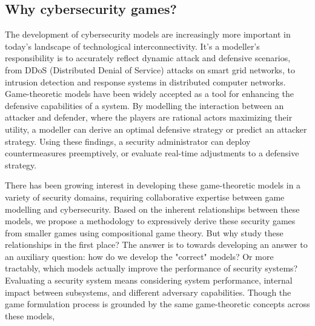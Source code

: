 





\subsection{Why cybersecurity games?}

The development of cybersecurity models are increasingly more important in today's landscape of technological interconnectivity. It's a modeller's responsibility is to accurately reflect dynamic attack and defensive scenarios, from DDoS (Distributed Denial of Service) attacks on smart grid networks, to intrusion detection and response systems in distributed computer networks. Game-theoretic models have been widely accepted as a tool for enhancing the defensive capabilities of a system. By modelling the interaction between an attacker and defender, where the players are rational actors maximizing their utility, a modeller can derive an optimal defensive strategy or predict an attacker strategy. Using these findings, a security administrator can deploy countermeasures preemptively, or evaluate real-time adjustments to a defensive strategy. 

There has been growing interest in developing these game-theoretic models in a variety of security domains, requiring collaborative expertise between game modelling and cybersecurity. Based on the inherent relationships between these models, we propose a methodology to expressively derive these security games from smaller games using compositional game theory. But why study these relationships in the first place? The answer is to towards developing an answer to an auxiliary question: how do we develop the "correct" models? Or more tractably, which models actually improve the performance of security systems? Evaluating a security system means considering system performance, internal impact between subsystems, and different adversary capabilities. Though the game formulation process is grounded by the same game-theoretic concepts across these models, 

